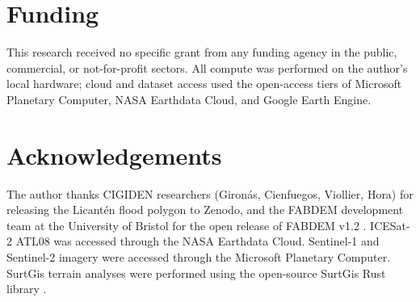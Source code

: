 \documentclass[preprint,authoryear,number]{elsarticle}
\begin{document}
\section*{Funding}

This research received no specific grant from any funding agency in the public, commercial, or not-for-profit sectors. All compute was performed on the author's local hardware; cloud and dataset access used the open-access tiers of Microsoft Planetary Computer, NASA Earthdata Cloud, and Google Earth Engine.

\section*{Acknowledgements}

The author thanks CIGIDEN researchers (Giron\'as, Cienfuegos, Viollier, Hora) for releasing the Licant\'en flood polygon to Zenodo, and the FABDEM development team at the University of Bristol for the open release of FABDEM v1.2 \citep{Hawker2022FABDEM}. ICESat-2 ATL08 was accessed through the NASA Earthdata Cloud. Sentinel-1 and Sentinel-2 imagery were accessed through the Microsoft Planetary Computer. SurtGis terrain analyses were performed using the open-source SurtGis Rust library \citep{SurtGis2026}.




\end{document}
